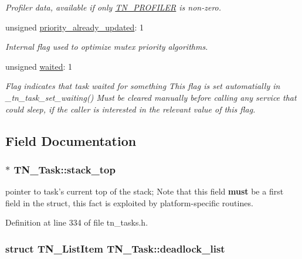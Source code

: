 \begin{DoxyCompactItemize}
\begin{DoxyCompactList}\small\item\em Profiler data, available if only {\ttfamily \hyperlink{tn__cfg__default_8h_a49a546b18cc1f75b51d4cf8b290634dd}{T\+N\+\_\+\+P\+R\+O\+F\+I\+L\+E\+R}} is non-\/zero. \end{DoxyCompactList}\item 
unsigned \hyperlink{structTN__Task_abb4d22974c7317dd610f646b9048656d}{priority\+\_\+already\+\_\+updated}\+: 1
\begin{DoxyCompactList}\small\item\em Internal flag used to optimize mutex priority algorithms. \end{DoxyCompactList}\item 
unsigned \hyperlink{structTN__Task_a47c3a0a27be1ee526a1599a2ca8bb269}{waited}\+: 1
\begin{DoxyCompactList}\small\item\em Flag indicates that task waited for something This flag is set automatially in {\ttfamily \+\_\+tn\+\_\+task\+\_\+set\+\_\+waiting()} Must be cleared manually before calling any service that could sleep, if the caller is interested in the relevant value of this flag. \end{DoxyCompactList}\end{DoxyCompactItemize}


\subsection{Field Documentation}
\hypertarget{structTN__Task_a6e31948663b2846ac9dddc05f529286a}{
\subsubsection[{stack\+\_\+top}]{$\ast$ T\+N\+\_\+\+Task\+::stack\+\_\+top}}\label{structTN__Task_a6e31948663b2846ac9dddc05f529286a}


pointer to task's current top of the stack; Note that this field {\bfseries must} be a first field in the struct, this fact is exploited by platform-\/specific routines. 



Definition at line 334 of file tn\+\_\+tasks.\+h.

\hypertarget{structTN__Task_a097e79851e01fb3c73f0346d99ea8b7e}{
\subsubsection[{deadlock\+\_\+list}]{\setlength{\rightskip}{0pt plus 5cm}struct {\bf T\+N\+\_\+\+List\+Item} T\+N\+\_\+\+Task\+::deadlock\+\_\+list}}\label{structTN__Task_a097e79851e01fb3c73f0346d99ea8b7e}


